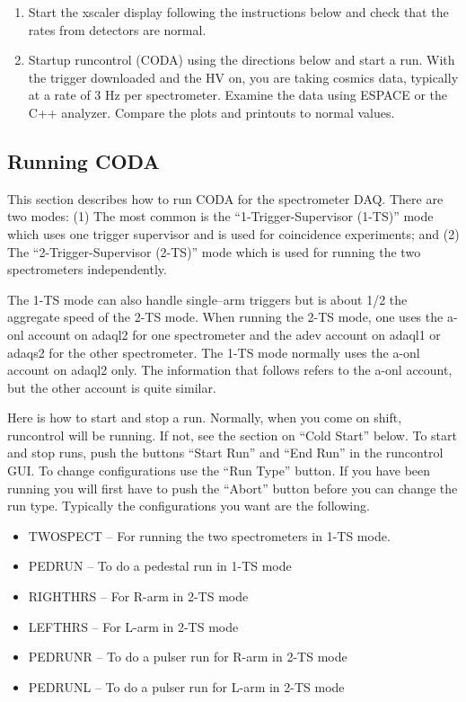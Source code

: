 {\begin{enumerate}
\item{Start the xscaler
display following the instructions below and
check that the rates from detectors are normal.}
 
\item{Startup runcontrol (CODA) using the directions below
and start a run.  With the trigger downloaded
and the HV on, you are taking cosmics data, typically at 
a rate of 3 Hz per spectrometer.  
Examine the data using ESPACE or the C++ analyzer.
Compare the plots and printouts to normal values.}

\end{enumerate}

\subsection{Running CODA}

\par
This section describes how to run CODA for
the spectrometer DAQ.  There are two modes:
(1) The most common is the ``1-Trigger-Supervisor (1-TS)''
mode which uses one trigger supervisor and
is used for coincidence experiments; and
(2) The ``2-Trigger-Supervisor (2-TS)'' mode which
is used for running the two spectrometers
independently.

\par
The 1-TS mode can also handle single--arm
triggers but is about 1/2 the aggregate speed
of the 2-TS mode.  When running the 2-TS
mode, one uses the a-onl account on adaql2 for one
spectrometer and the adev account on adaql1 or adaqs2 
for the other spectrometer.  
The 1-TS mode normally uses the 
a-onl account on adaql2 only.
The information that follows refers to 
the a-onl account, but the other account is quite similar.

\par
Here is how to start and stop a run.
Normally, when you come on shift, 
runcontrol will be running.  If not,
see the section on ``Cold Start'' below.
To start and stop runs, push the buttons
``Start Run'' and ``End Run'' in the
runcontrol GUI.   To change configurations
use the ``Run Type'' button.  If you have
been running you will first have to push the
``Abort'' button before you can change the 
run type. Typically the configurations
you want are the following.

\begin{itemize} 
\item[~]TWOSPECT -- For running the two spectrometers in
1-TS mode.
\item[~]PEDRUN -- To do a pedestal run in 1-TS mode
\item[~]RIGHTHRS -- For R-arm in 2-TS mode
\item[~]LEFTHRS -- For L-arm in 2-TS mode
\item[~]PEDRUNR -- To do a pulser run for R-arm in 2-TS mode
\item[~]PEDRUNL -- To do a pulser run for L-arm in 2-TS mode
\end{itemize} 

}
